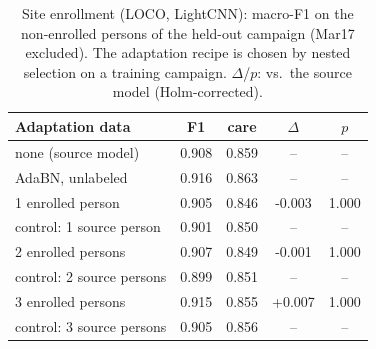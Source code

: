 \begin{table}[t]
\centering
\caption{Site enrollment (LOCO, LightCNN): macro-F1 on the non-enrolled persons of the held-out campaign (Mar17 excluded). The adaptation recipe is chosen by nested selection on a training campaign. $\Delta$/$p$: vs.\ the source model (Holm-corrected).}
\label{tab:enroll}
\setlength{\tabcolsep}{3pt}
\begin{tabular}{lcccc}
\toprule
Adaptation data & F1 & care & $\Delta$ & $p$ \\
\midrule
none (source model) & 0.908 & 0.859 & -- & -- \\
AdaBN, unlabeled & 0.916 & 0.863 & -- & -- \\
1 enrolled person & 0.905 & 0.846 & -0.003 & 1.000 \\
\quad control: 1 source person & 0.901 & 0.850 & -- & -- \\
2 enrolled persons & 0.907 & 0.849 & -0.001 & 1.000 \\
\quad control: 2 source persons & 0.899 & 0.851 & -- & -- \\
3 enrolled persons & 0.915 & 0.855 & +0.007 & 1.000 \\
\quad control: 3 source persons & 0.905 & 0.856 & -- & -- \\
\bottomrule
\end{tabular}
\end{table}
